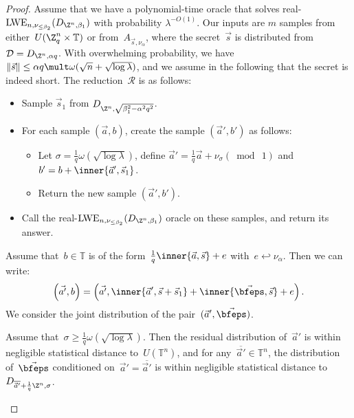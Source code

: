 \begin{proof}
Assume that we have a polynomial-time oracle that solves real-$\text{LWE}_{n,\nu_{\leq \beta_2}}(D_{\Z^n, \beta_1})$ with probability $\lambda^{-O(1)}$. Our inputs are $m$ samples from
either~$U(\Z_q^n \times \mathbb{T})$ or from~$A_{\vec{s},\nu_{ \alpha}}$, 
where the secret~$\vec{s}$ is distributed from $\mathcal{D}= D_{\Z^n,\alpha q}$. With overwhelming probability, we have
$ \Vert \vec{s} \Vert \leq \alpha q \mult \omega(\sqrt{n} + \sqrt{\log \lambda})$, and we assume in the following that the secret is indeed short.
 The reduction~$\mathcal{R}$ is as follows: 
 
 \begin{itemize}
\item[$\bullet$] Sample $\vec{s}_1$ from $D_{\Z^n, \sqrt{\beta_1^2 - \alpha^2 q^2} }$.
\item[$\bullet$] For each sample $(\vec{a},b)$, create the sample $(\vec{a}',b')$ as follows:
\begin{itemize}
\item[$\bullet$] Let $\sigma = \frac{1}{q} \omega (\sqrt{ \log \lambda })$,
define $\vec{a}' = \frac{1}{q} \vec{a} + \nu_{\sigma} (\bmod~1)$ and $b' = b + \inner{\vec{a}', \vec{s}_1}$.
\item[$\bullet$] Return the new sample $(\vec{a}',b')$.
\end{itemize}
\item[$\bullet$] Call the real-$\text{LWE}_{n,\nu_{\leq \beta_2}}(D_{\Z^n, \beta_1})$ oracle on these
  samples, and return its answer.
\end{itemize} 
Assume that~$b \in \mathbb{T}$ is of the form~$\frac{1}{q}
\inner{\vec{a},\vec{s}}+ e$ with~$e \hookleftarrow \nu_{\alpha}$. Then
we can write:
\begin{equation}
\label{eq:real_rewrite_b}
\left(\vec{a'}, b\right) = 
\left(
\vec{a'}, \inner{\vec{a}',\vec{s} + \vec{s}_1} +  \inner{\vec{\bfeps},\vec{s}} + e  \right).  
\end{equation}
We consider the joint distribution of the pair~$(\vec{a}',\vec{\bfeps})$.  

\begin{claim}
\label{cl:real_left_size}
Assume that~$\sigma \geq \frac{1}{q}\omega(\sqrt{\log \lambda})$. Then the residual
  distribution of~$\vec{a}'$ is within negligible statistical distance
  to~$U(\mathbb{T}^n)$, and for any~$\overline{\vec{a}'} \in \mathbb{T}^n$, the
  distribution of~$\vec{\bfeps}$ conditioned on~$\vec{a}' =
  \overline{\vec{a}'}$ is within negligible statistical distance
  to~$D_{ \overline{\vec{a}'} + \frac{1}{q} \Z^n,\sigma}$.
\end{claim}



\end{proof}
